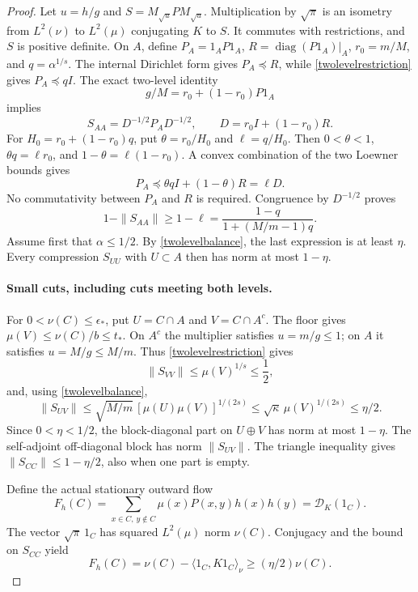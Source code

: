 \begin{proof}
Let $u=h/g$ and $S=M_{\sqrt u}PM_{\sqrt u}$. Multiplication by $\sqrt\pi$
is an isometry from $L^2(\nu)$ to $L^2(\mu)$ conjugating $K$ to $S$.
It commutes with restrictions, and $S$ is positive definite.
On $A$, define $P_A=1_A P1_A$, $R=\operatorname{diag}(P1_A)|_A$,
$r_0=m/M$, and $q=\alpha^{1/s}$. The internal Dirichlet form gives
$P_A\preceq R$, while \eqref{twolevelrestriction} gives $P_A\preceq qI$.
The exact two-level identity
\[
 g/M=r_0+(1-r_0)P1_A
\]
implies
\[
 S_{AA}=D^{-1/2}P_A D^{-1/2},\qquad D=r_0I+(1-r_0)R.
\]
For $H_0=r_0+(1-r_0)q$, put $\theta=r_0/H_0$ and $\ell=q/H_0$.
Then $0<\theta<1$, $\theta q=\ell r_0$, and
$1-\theta=\ell(1-r_0)$. A convex combination of the two Loewner bounds gives
\[
 P_A\preceq\theta qI+(1-\theta)R=\ell D.
\]
No commutativity between $P_A$ and $R$ is required. Congruence by
$D^{-1/2}$ proves
\begin{equation}\label{twolevelkilled}
 1-\|S_{AA}\|\geq1-\ell
 =\frac{1-q}{1+(M/m-1)q}.
\end{equation}
Assume first that $\alpha\leq1/2$. By \eqref{twolevelbalance}, the last
expression is at least $\eta$. Every compression $S_{UU}$ with $U\subset A$
then has norm at most $1-\eta$.

\paragraph{Small cuts, including cuts meeting both levels.}
For $0<\nu(C)\leq\epsilon_*$, put $U=C\cap A$ and $V=C\cap A^c$.
The floor gives $\mu(V)\leq\nu(C)/b\leq t_*$.
On $A^c$ the multiplier satisfies $u=m/g\leq1$; on $A$ it satisfies
$u=M/g\leq M/m$. Thus \eqref{twolevelrestriction} gives
\[
 \|S_{VV}\|\leq\mu(V)^{1/s}\leq\frac12,
\]
and, using \eqref{twolevelbalance},
\[
 \|S_{UV}\|\leq\sqrt{M/m}\,[\mu(U)\mu(V)]^{1/(2s)}
 \leq\sqrt\kappa\,\mu(V)^{1/(2s)}\leq\eta/2.
\]
Since $0<\eta<1/2$, the block-diagonal part on $U\oplus V$ has norm at
most $1-\eta$. The self-adjoint off-diagonal block has norm
$\|S_{UV}\|$. The triangle inequality gives
$\|S_{CC}\|\leq1-\eta/2$, also when one part is empty.

Define the actual stationary outward flow
\[
 F_h(C)=\sum_{x\in C,\,y\notin C}\mu(x)P(x,y)h(x)h(y)
       =\mathcal D_K(1_C).
\]
The vector $\sqrt\pi\,1_C$ has squared $L^2(\mu)$ norm $\nu(C)$.
Conjugacy and the bound on $S_{CC}$ yield
\begin{equation}\label{twolevelsmallflow}
 F_h(C)=\nu(C)-\langle1_C,K1_C\rangle_\nu
       \geq(\eta/2)\nu(C).
\end{equation}


\end{proof}
